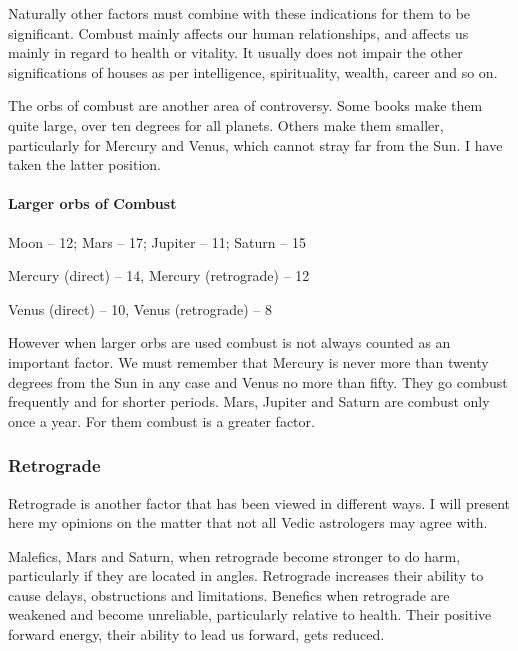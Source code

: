 Naturally other factors must combine with these indications for them to be significant.  Combust mainly affects our human relationships, and affects us mainly in regard to health or vitality. It usually does not impair the other significations of houses as per intelligence, spirituality, wealth, career and so on.

 

The orbs of combust are another area of controversy. Some books make them quite large, over ten degrees for all planets. Others make them smaller, particularly for Mercury and Venus, which cannot stray far from the Sun. I have taken the latter position.

 

\paragraph{Larger orbs of Combust}

Moon – 12; Mars – 17; Jupiter – 11; Saturn – 15

Mercury (direct) – 14, Mercury (retrograde) – 12

Venus (direct) – 10, Venus (retrograde) – 8

 

However when larger orbs are used combust is not always counted as an important factor. We must remember that Mercury is never more than twenty degrees from the Sun in any case and Venus no more than fifty. They go combust frequently and for shorter periods. Mars, Jupiter and Saturn are combust only once a year. For them combust is a greater factor.

 

\subsubsection{Retrograde}

 

Retrograde is another factor that has been viewed in different ways. I will present here my opinions on the matter that not all Vedic astrologers may agree with.

 

Malefics, Mars and Saturn, when retrograde become stronger to do harm, particularly if they are located in angles. Retrograde increases their ability to cause delays, obstructions and limitations.
Benefics when retrograde are weakened and become unreliable, particularly relative to health. Their positive forward energy, their ability to lead us forward, gets reduced.
 

